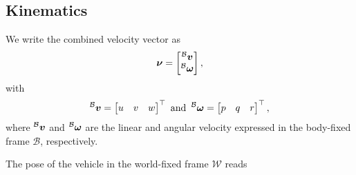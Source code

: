 
\subsection{Kinematics}

We write the combined velocity vector \nub as
\begin{equation}
	\mbox{$\bm{\nu}$} = 
	\begin{bmatrix}
		\prescript{\mathcal{B}}{}{\mbox{$\bm{v}$}} \\
		\prescript{\mathcal{B}}{}{\mbox{$\bm{\omega}$}}
	\end{bmatrix}
	,
\end{equation}
with 
\begin{equation}
	\label{eq:velocities-in-body-frame}
	\prescript{\mathcal{B}}{}{\mbox{$\bm{v}$}} = 
	\begin{bmatrix}
		u & v & w
	\end{bmatrix}^\top
	\text{ and }
	\prescript{\mathcal{B}}{}{\mbox{$\bm{\omega}$}} = 
	\begin{bmatrix}
		p & q & r
	\end{bmatrix}^\top
	,
\end{equation}
where $\prescript{\mathcal{B}}{}{\mbox{$\bm{v}$}}$ and $\prescript{\mathcal{B}}{}{\mbox{$\bm{\omega}$}}$ are the linear and angular velocity expressed in the body-fixed frame $\mathcal{B}$, respectively.

The pose of the vehicle in the world-fixed frame $\mathcal{W}$ reads

